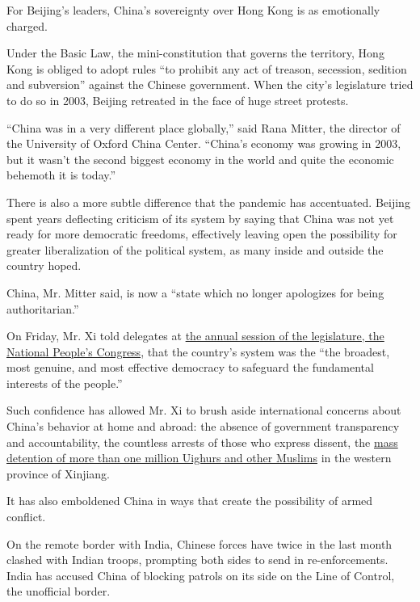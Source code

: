 For Beijing's leaders, China's sovereignty over Hong Kong is as
emotionally charged.

Under the Basic Law, the mini-constitution that governs the territory,
Hong Kong is obliged to adopt rules ``to prohibit any act of treason,
secession, sedition and subversion'' against the Chinese government.
When the city's legislature tried to do so in 2003, Beijing retreated in
the face of huge street protests.

``China was in a very different place globally,'' said Rana Mitter, the
director of the University of Oxford China Center. ``China's economy was
growing in 2003, but it wasn't the second biggest economy in the world
and quite the economic behemoth it is today.''

There is also a more subtle difference that the pandemic has
accentuated. Beijing spent years deflecting criticism of its system by
saying that China was not yet ready for more democratic freedoms,
effectively leaving open the possibility for greater liberalization of
the political system, as many inside and outside the country hoped.

China, Mr. Mitter said, is now a ``state which no longer apologizes for
being authoritarian.''

On Friday, Mr. Xi told delegates at
\href{https://www.nytimes3xbfgragh.onion/2020/05/21/business/economy/coronavirus-china-economy.html}{the
annual session of the legislature, the National People's Congress}, that
the country's system was the ``the broadest, most genuine, and most
effective democracy to safeguard the fundamental interests of the
people.''

Such confidence has allowed Mr. Xi to brush aside international concerns
about China's behavior at home and abroad: the absence of government
transparency and accountability, the countless arrests of those who
express dissent, the
\href{https://www.nytimes3xbfgragh.onion/interactive/2019/11/16/world/asia/china-xinjiang-documents.html}{mass
detention of more than one million Uighurs and other Muslims} in the
western province of Xinjiang.

It has also emboldened China in ways that create the possibility of
armed conflict.

On the remote border with India, Chinese forces have twice in the last
month clashed with Indian troops, prompting both sides to send in
re-enforcements. India has accused China of blocking patrols on its side
on the Line of Control, the unofficial border.

